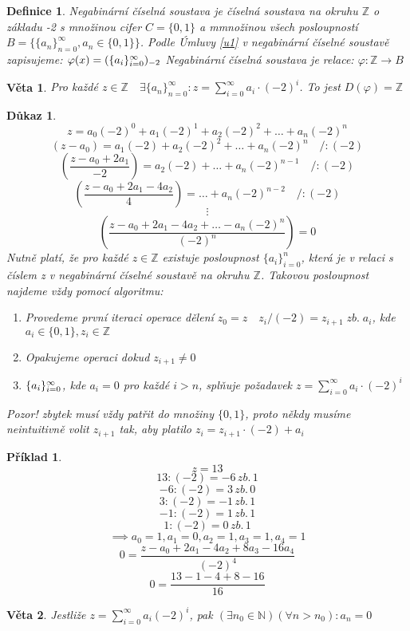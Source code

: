\documentclass[12pt]{book}
\newtheorem{definice}{Definice}
\newtheorem{veta}{Věta}
\newtheorem*{pr}{Příklad}
\newtheorem*{dukaz}{Důkaz}
\begin{document}
\begin{definice}
	Negabinární číselná soustava je číselná soustava na okruhu $\mathbb{Z}$ o základu -2 s množinou cifer $C=\{0,1\}$ a mmnožinou všech posloupností
	$B=\{\{a_n\}_{n=0}^\infty,a_n \in \{0,1\} \}$.\newline
	Podle Úmluvy \ref{u1} v negabinární číselné soustavě zapisujeme:
	$\varphi(x) = (\{a_i\}_{i=0}^{\infty})_{-2}$\newline
	Negabinární číselná soustava je relace:
	$\varphi:\mathbb{Z}\to B$
\end{definice}
\begin{veta}
	Pro každé $z \in \mathbb{Z} \quad \exists\{a_n\}_{n=0}^\infty:z=\sum_{i=0}^{\infty}a_i\cdot(-2)^i$. To jest $D(\varphi)=\mathbb{Z}$
\end{veta}
\begin{dukaz}
	$$z=a_0(-2)^0+a_1(-2)^1+a_2(-2)^2+\dots+a_n(-2)^n$$
	$$(z-a_0)=a_1(-2)+a_2(-2)^2+\dots+a_n(-2)^n\quad /:(-2)$$
	$$\left(\frac{z-a_0+2a_1}{-2}\right)=a_2(-2)+\dots+a_n(-2)^{n-1} \quad /:(-2)$$
	$$\left(\frac{z-a_0+2a_1-4a_2}{4}\right)=\dots+a_n(-2)^{n-2}\quad /:(-2)$$
	$$\vdots$$
	$$\left(\frac{z-a_0+2a_1-4a_2+\dots-a_n(-2)^n}{(-2)^n}\right)=0$$
	Nutně platí, že pro každé $z\in\mathbb{Z}$ existuje posloupnost $\{a_i\}_{i=0}^n$, která je v relaci s číslem z v negabinární číselné soustavě na okruhu $\mathbb{Z}$.\newline
	Takovou posloupnost najdeme vždy pomocí algoritmu:
	\begin{enumerate}
		\item Provedeme první iteraci operace dělení $z_0=z\quad z_i/(-2)=z_{i+1}\;zb.\;a_i$, kde $ a_i\in\{0,1\}, 
		z_i\in\mathbb{Z}$
		\item Opakujeme operaci dokud $z_{i+1}\ne0$
		\item $\{a_i\}_{i=0}^{\infty}$, kde $a_i=0$ pro každé $i>n$, splňuje požadavek $z=
		 \sum_{i=0}^{\infty}a_i\cdot(-2)^i$
	\end{enumerate}
	Pozor! zbytek musí vždy patřit do množiny $\{0,1\}$, proto někdy musíme neintuitivně volit $z_{i+1}$ tak, aby platilo $z_i=z_{i+1}\cdot(-2)+a_i$
\end{dukaz}
\begin{pr}
	$$z=13$$
	$$13:(-2)=-6\,zb.\,1$$
	$$-6:(-2)=3\,zb.\,0$$
	$$3:(-2)=-1\,zb.\,1$$
	$$-1:(-2)=1\,zb.\,1$$
	$$1:(-2)=0\,zb.\,1$$
	$$\implies a_0=1, a_1=0,a_2=1,a_3=1,a_4=1$$
	$$0=\frac{z-a_0+2a_1-4a_2+8a_3-16a_4}{(-2)^4}$$
	$$0=\frac{13-1-4+8-16}{16}$$
\end{pr}
\begin{veta}
	Jestliže $z=\sum_{i=0}^{\infty}a_i(-2)^i$, pak $(\exists n_0 \in \mathbb{N})(\forall n>n_0):a_n=0$
\end{veta}
\end{document}

